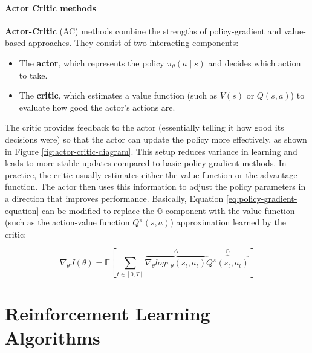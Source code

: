 \paragraph{Actor Critic methods}

\textbf{Actor-Critic} (AC) \cite{grondman2012survey} methods combine the strengths of policy-gradient and value-based approaches. They consist of two interacting components:
\begin{itemize}
  \item The \textbf{actor}, which represents the policy $\pi_\theta(a \mid s)$ and decides which action to take.
  \item The \textbf{critic}, which estimates a value function (such as $V(s)$ or $Q(s, a)$) to evaluate how good the actor's actions are.
\end{itemize}

The critic provides feedback to the actor (essentially telling it how good its decisions were) so that the actor can update the policy more effectively, as shown in Figure \ref{fig:actor-critic-diagram}. This setup reduces variance in learning and leads to more stable updates compared to basic policy-gradient methods. In practice, the critic usually estimates either the value function or the advantage function. The actor then uses this information to adjust the policy parameters in a direction that improves performance. Basically, Equation \ref{eq:policy-gradient-equation} can be modified to replace the $\mathbb{G}$ component with the value function (such as the action-value function $Q^\pi(s, a)$) approximation learned by the critic:

\begin{equation}
  \label{eq:actor-critic-equation}
  \nabla _ {\theta} J(\theta) = \mathbb{E}
    \left[
      \sum _ {t \in [0, T]} \overbrace{\nabla _ {\theta} log \pi _ \theta (s_t, a_t)}^{\Delta} \overbrace{Q^\pi(s_t, a_t)}^{\mathbb{G}}
    \right]
\end{equation}


\section{Reinforcement Learning Algorithms}

